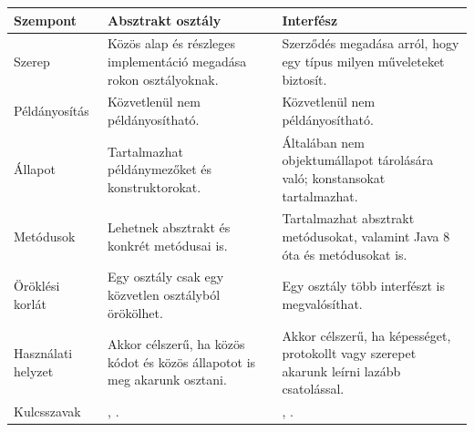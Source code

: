 \begin{tabularx}{\textwidth}{L{32mm}X X}
\toprule
\textbf{Szempont} & \textbf{Absztrakt osztály} & \textbf{Interfész} \\
\midrule
Szerep & Közös alap és részleges implementáció megadása rokon osztályoknak. & Szerződés megadása arról, hogy egy típus milyen műveleteket biztosít. \\
Példányosítás & Közvetlenül nem példányosítható. & Közvetlenül nem példányosítható. \\
Állapot & Tartalmazhat példánymezőket és konstruktorokat. & Általában nem objektumállapot tárolására való; konstansokat tartalmazhat. \\
Metódusok & Lehetnek absztrakt és konkrét metódusai is. & Tartalmazhat absztrakt metódusokat, valamint Java 8 óta  és  metódusokat is. \\
Öröklési korlát & Egy osztály csak egy közvetlen osztályból örökölhet. & Egy osztály több interfészt is megvalósíthat. \\
Használati helyzet & Akkor célszerű, ha közös kódot és közös állapotot is meg akarunk osztani. & Akkor célszerű, ha képességet, protokollt vagy szerepet akarunk leírni lazább csatolással. \\
Kulcsszavak & , . & , . \\
\bottomrule
\end{tabularx}
